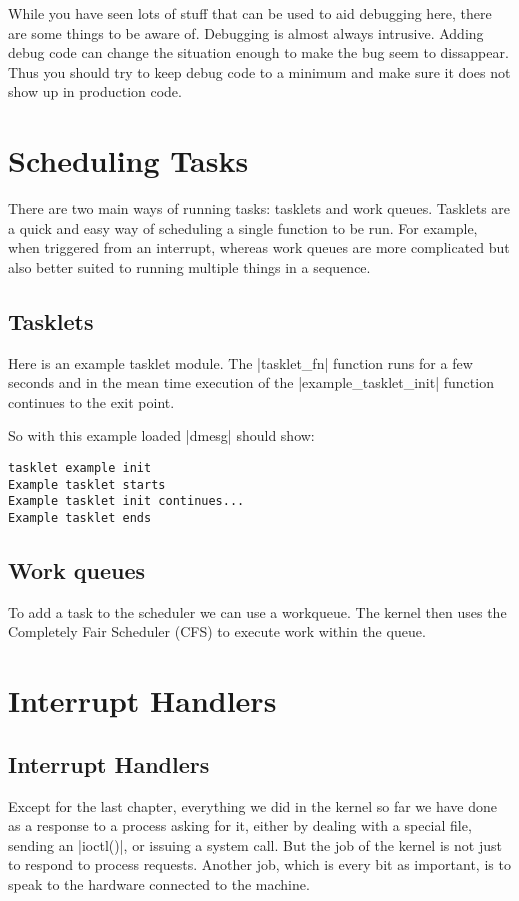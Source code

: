 \documentclass[10pt, oneside]{book}
\begin{document}
While you have seen lots of stuff that can be used to aid debugging here, there are some things to be aware of. Debugging is almost always intrusive.
Adding debug code can change the situation enough to make the bug seem to dissappear.
Thus you should try to keep debug code to a minimum and make sure it does not show up in production code.

\section{Scheduling Tasks}
\label{sec:scheduling_tasks}
There are two main ways of running tasks: tasklets and work queues.
Tasklets are a quick and easy way of scheduling a single function to be run.
For example, when triggered from an interrupt, whereas work queues are more complicated but also better suited to running multiple things in a sequence.

\subsection{Tasklets}
\label{sec:tasklet}
Here is an example tasklet module.
The \cpp|tasklet_fn| function runs for a few seconds and in the mean time execution of the \cpp|example_tasklet_init| function continues to the exit point.


So with this example loaded \sh|dmesg| should show:

\begin{verbatim}
tasklet example init
Example tasklet starts
Example tasklet init continues...
Example tasklet ends
\end{verbatim}

\subsection{Work queues}
\label{sec:workqueue}
To add a task to the scheduler we can use a workqueue.
The kernel then uses the Completely Fair Scheduler (CFS) to execute work within the queue.


\section{Interrupt Handlers}
\label{sec:interrupt_handler}
\subsection{Interrupt Handlers}
\label{sec:irq}
Except for the last chapter, everything we did in the kernel so far we have done as a response to a process asking for it, either by dealing with a special file, sending an \cpp|ioctl()|, or issuing a system call.
But the job of the kernel is not just to respond to process requests.
Another job, which is every bit as important, is to speak to the hardware connected to the machine.
\end{document}
